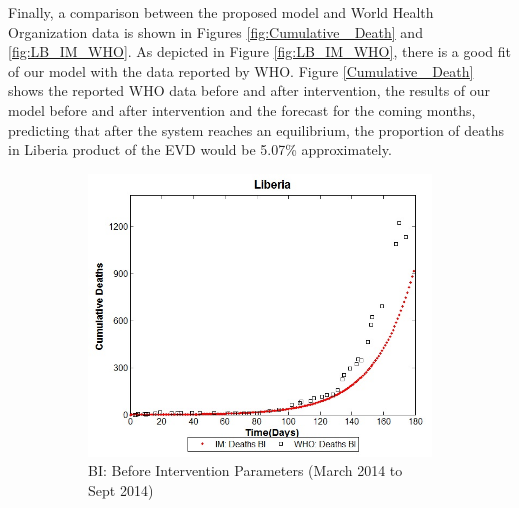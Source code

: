 
\noindent Finally, a comparison between the proposed model and World Health Organization data is shown in Figures  \ref{fig:Cumulative _Death} and \ref{fig:LB_IM_WHO}. As depicted in Figure \ref{fig:LB_IM_WHO}, there is a good fit of our model with the data reported by WHO. Figure \ref{Cumulative _Death} shows  the reported WHO data before and after intervention, the results of our model before and after intervention and the forecast for the coming months, predicting that after the system reaches an equilibrium, the proportion of deaths in Liberia product of the EVD would be 5.07\% approximately.



\begin{figure}[h!]
 \centering 
 \begin{subfigure}[b]{0.38\textwidth}
  \includegraphics[width=\textwidth]{LB_BI_SD_WHO_IM} \caption{BI: Before Intervention Parameters (March 2014  to Sept 2014)} \label{fig:LB_BI_SD_WHO_IM} \end{subfigure}
 \hspace{.1cm}
\begin{subfigure}[b]{0.38\textwidth}

\end{subfigure}
\end{figure}
